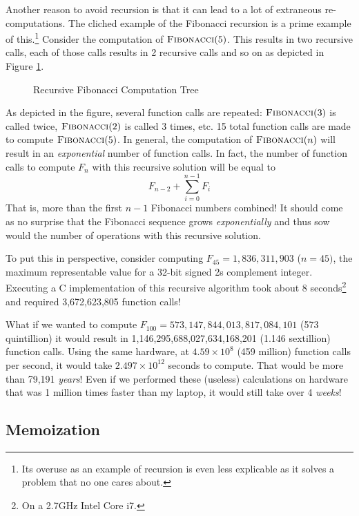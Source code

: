 Another reason to avoid recursion is that it can lead to a lot of
extraneous re-computations.  The cliched example of the Fibonacci
recursion is a prime example of this.\footnote{Its overuse as
an example of recursion is even less explicable as it solves a problem
that no one cares about.}  Consider the computation of 
$\textsc{Fibonacci}(5)$.  This results in two recursive calls, each of
those calls results in 2 recursive calls and so on as depicted in 
Figure \ref{figure:fibonacciTree}.

\begin{figure}
\centering

\caption{Recursive Fibonacci Computation Tree}
\label{figure:fibonacciTree}
\end{figure}

As depicted in the figure, several function calls are repeated: 
$\textsc{Fibonacci}(3)$ is called twice, $\textsc{Fibonacci}(2)$
is called 3 times, etc.  15 total function calls are made to
compute $\textsc{Fibonacci}(5)$.  In general, the computation
of $\textsc{Fibonacci}(n)$ will result in an \emph{exponential}
number of function calls.  In fact, the number of function calls
to compute $F_n$ with this recursive solution will be equal to 
  $$F_{n-2} + \sum_{i=0}^{n-1} F_{i}$$ 
That is, more than the first $n-1$ Fibonacci numbers combined!
It should come as no surprise that the Fibonacci sequence
grows \emph{exponentially} and thus sow would the number of 
operations with this recursive solution.

To put this in perspective, consider computing $F_{45} = 1,836,311,903$ 
($n = 45)$, the maximum representable value for a 32-bit signed 2s
complement integer.  Executing a C implementation of this recursive
algorithm took about 8 seconds\footnote{On a 2.7GHz Intel Core i7.} 
and required 3,672,623,805 function calls!

What if we wanted to compute $F_{100} = 573,147,844,013,817,084,101$ 
(573 quintillion) it would result in 1,146,295,688,027,634,168,201 
(1.146 sextillion) function calls.  Using the same hardware, at 
$4.59\times 10^8$ (459 million) function calls per second, it would
take $2.497 \times 10^{12}$ seconds to compute.  That would be more than
79,191 \emph{years}!  Even if we performed these (useless) calculations
on hardware that was 1 million times faster than my laptop, it would
still take over 4 \emph{weeks}!

\subsection{Memoization}

